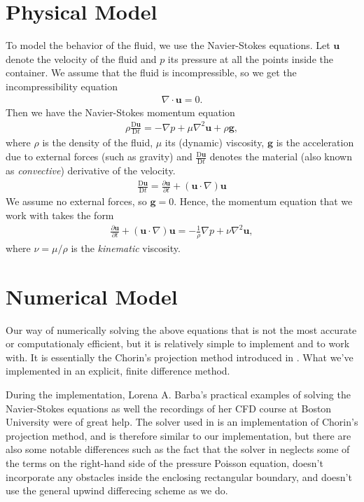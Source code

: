 \documentclass[11pt,a4paper,twoside,openright]{report}
\begin{document}
\section{Physical Model}
To model the behavior of the fluid, we use the Navier-Stokes equations. Let $\mathbf u$ denote the velocity of the fluid and $p$ its pressure at all the points inside the container. We assume that the fluid is incompressible, so we get the incompressibility equation
\newcommand{\uu}{\mathbf u}
\newcommand{\D}{\mathrm D}
\begin{align}\label{eq:incom}
	\nabla\cdot\uu=0.
\end{align}
Then we have the Navier-Stokes momentum equation
\newcommand{\conv}{\frac{\D\uu}{\D t}}
\begin{align*}
	\rho\conv=-\nabla p+\mu\nabla^2\uu+\rho\mathbf g,
\end{align*}
where $\rho$ is the density of the fluid, $\mu$ its (dynamic) viscosity, $\mathbf g$ is the acceleration due to external forces (such as gravity) and $\conv$ denotes the material (also known as \emph{convective}) derivative of the velocity.
\newcommand{\pder}[2]{\frac{\partial #1}{\partial #2}}
\begin{align}
	\conv=\pder\uu t+(\uu\cdot\nabla)\uu
\end{align}
We assume no external forces, so $\mathbf g=0$. Hence, the momentum equation that we work with takes the form
\begin{align}\label{eq:momentum}
	\pder\uu t+(\uu\cdot\nabla)\uu=-\frac1\rho\nabla p+\nu\nabla^2\uu,
\end{align}
where $\nu=\mu/\rho$ is the \emph{kinematic} viscosity.
\section{Numerical Model}
Our way of numerically solving the above equations that is not the most accurate or computationaly efficient, but it is relatively simple to implement and to work with. It is essentially the Chorin's projection method introduced in \cite{Chorin}. What we've implemented in an explicit, finite difference method.

During the implementation, Lorena A. Barba's practical examples of solving the Navier-Stokes equations \cite{CFDpython} as well the recordings of her CFD course at Boston University \cite{BarbaCourse} were of great help. The solver used in \cite{CFDpython} is an implementation of Chorin's projection method, and is therefore similar to our implementation, but there are also some notable differences such as the fact that the solver in \cite{CFDpython} neglects some of the terms on the right-hand side of the pressure Poisson equation, doesn't incorporate any obstacles inside the enclosing rectangular boundary, and doesn't use the general upwind differecing scheme as we do.
\end{document}
